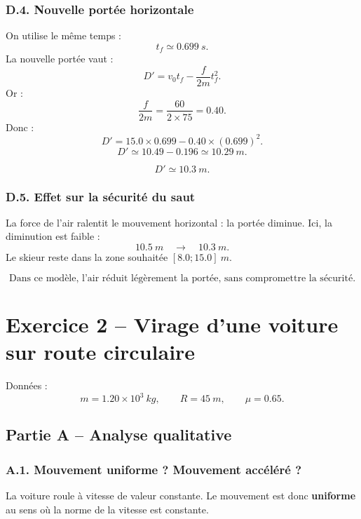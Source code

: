 \documentclass[11pt,a4paper]{article}
\begin{document}
\subsubsection*{D.4. Nouvelle portée horizontale}

On utilise le même temps :
\[
t_f\simeq 0.699\ \si{s}.
\]
La nouvelle portée vaut :
\[
D'=v_0t_f-\frac{f}{2m}t_f^2.
\]
Or :
\[
\frac{f}{2m}=\frac{60}{2\times 75}=0.40.
\]
Donc :
\[
D'=15.0\times 0.699-0.40\times (0.699)^2.
\]
\[
D'\simeq 10.49-0.196\simeq 10.29\ \si{m}.
\]

\begin{resultatbox}
\[
\boxed{D'\simeq \SI{10.3}{m}.}
\]
\end{resultatbox}

\subsubsection*{D.5. Effet sur la sécurité du saut}

La force de l'air ralentit le mouvement horizontal : la portée diminue.
Ici, la diminution est faible :
\[
10.5\ \si{m}\quad\longrightarrow\quad 10.3\ \si{m}.
\]
Le skieur reste dans la zone souhaitée $[8.0;15.0]\ \si{m}$.

\begin{resultatbox}
\[
\boxed{\text{Dans ce modèle, l'air réduit légèrement la portée, sans compromettre la sécurité.}}
\]
\end{resultatbox}

\newpage
\section{Exercice 2 -- Virage d'une voiture sur route circulaire}

Données :
\[
m=1.20\times 10^3\ \si{kg},\qquad R=\SI{45}{m},\qquad \mu=0.65.
\]

\subsection{Partie A -- Analyse qualitative}

\subsubsection*{A.1. Mouvement uniforme ? Mouvement accéléré ?}

La voiture roule à vitesse de valeur constante. Le mouvement est donc \textbf{uniforme} au sens où la norme de la vitesse est constante.
\end{document}
